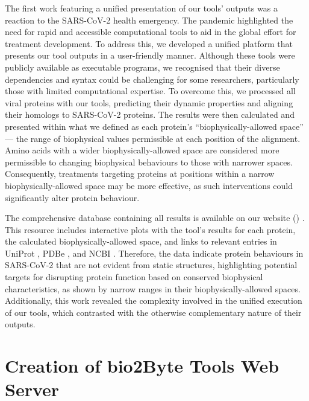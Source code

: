 The first work featuring a unified presentation of our tools' outputs was a reaction to the SARS-CoV-2 health emergency. The pandemic highlighted the need for rapid and accessible computational tools to aid in the global effort for treatment development. To address this, we developed a unified platform that presents our tool outputs in a user-friendly manner. Although these tools were publicly available as executable programs, we recognised that their diverse dependencies and syntax could be challenging for some researchers, particularly those with limited computational expertise. To overcome this, we processed all viral proteins with our tools, predicting their dynamic properties and aligning their homologs to SARS-CoV-2 proteins. The results were then calculated and presented within what we defined as each protein's ``biophysically-allowed space'' — the range of biophysical values permissible at each position of the alignment. Amino acids with a wider biophysically-allowed space are considered more permissible to changing biophysical behaviours to those with narrower spaces. Consequently, treatments targeting proteins at positions within a narrow biophysically-allowed space may be more effective, as such interventions could significantly alter protein behaviour.

The comprehensive database containing all results is available on our website () \cite{kagami_online_2021}. This resource includes interactive plots with the tool's results for each protein, the calculated biophysically-allowed space, and links to relevant entries in UniProt \cite{the_uniprot_consortium_uniprot_2023}, PDBe \cite{armstrong_pdbe_2020}, and NCBI \cite{sayers_database_2021}. Therefore, the data indicate protein behaviours in SARS-CoV-2 that are not evident from static structures, highlighting potential targets for disrupting protein function based on conserved biophysical characteristics, as shown by narrow ranges in their biophysically-allowed spaces. Additionally, this work revealed the complexity involved in the unified execution of our tools, which contrasted with the otherwise complementary nature of their outputs.

\section{Creation of bio2Byte Tools Web Server}

